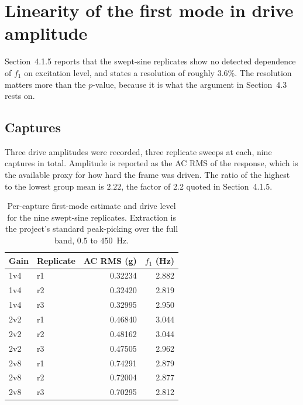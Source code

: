 %
%

\section{Linearity of the first mode in drive amplitude}
\label{app:lin}

Section~4.1.5 reports that the swept-sine replicates show no detected dependence
of $f_1$ on excitation level, and states a resolution of roughly 3.6\%. The resolution matters more than the $p$-value, because it is what the
argument in Section~4.3 rests on.

\subsection*{Captures}

Three drive amplitudes were recorded, three replicate sweeps at each, nine
captures in total. Amplitude is reported as the AC RMS of the response, which is
the available proxy for how hard the frame was driven. The ratio of the highest
to the lowest group mean is $2.22$, the factor of 2.2 quoted in Section~4.1.5.

\begin{table}[htbp]
\centering
\caption{Per-capture first-mode estimate and drive level for the nine swept-sine
replicates. Extraction is the project's standard peak-picking over the full band,
$0.5$ to $450$~Hz.}
\label{tab:lin-percapture}
\begin{tabular}{llrr}
\toprule
Gain & Replicate & AC RMS (g) & $f_1$ (Hz) \\
\midrule
1v4 & r1 & 0.32234 & 2.882 \\
1v4 & r2 & 0.32420 & 2.819 \\
1v4 & r3 & 0.32995 & 2.950 \\
\midrule
2v2 & r1 & 0.46840 & 3.044 \\
2v2 & r2 & 0.48162 & 3.044 \\
2v2 & r3 & 0.47505 & 2.962 \\
\midrule
2v8 & r1 & 0.74291 & 2.879 \\
2v8 & r2 & 0.72004 & 2.877 \\
2v8 & r3 & 0.70295 & 2.812 \\
\bottomrule
\end{tabular}
\end{table}

